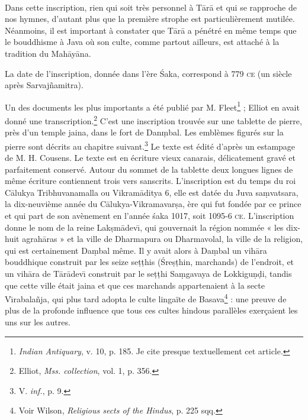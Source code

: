 \documentclass[a4paper, 11pt, oneside, french, landscape, twocolumn]{article}
\begin{document}
\paragraph{}
Dans cette inscription, rien qui soit très personnel à T\={a}r\={a} et qui se rapproche de nos hymnes, d'autant plus que la première strophe est particulièrement mutilée. Néanmoins, il est important à constater que T\={a}r\={a} a pénétré en même temps que le bouddhisme à Java où son culte, comme partout ailleurs, est attaché à la tradition du Mah\={a}y\={a}na.

La date de l'inscription, donnée dans l'ère \'{S}aka, correspond à 779 \textsc{ce} (un siècle après Sarvaj\~{n}amitra).

Un des documents les plus importants a été publié par M. Fleet\footnote{\emph{Indian Antiquary}, v. 10, p. 185. Je cite presque textuellement cet article.} ; Elliot en avait donné une transcription.\footnote{Elliot, \emph{Mss. collection}, vol. 1, p. 356.} C'est une inscription trouvée sur une tablette de pierre, près d'un temple jaina, dans le fort de Dan\d{m}bal. Les emblèmes figurés sur la pierre sont décrits au chapitre suivant.\footnote{V. \emph{inf.}, p. 9.} Le texte est édité d'après un estampage de M. H. Cousens. Le texte est en écriture vieux canarais, délicatement gravé et parfaitement conservé. Autour du sommet de la tablette deux longues lignes de même écriture contiennent trois vers sanscrits. L'inscription est du temps du roi C\={a}lukya Tribhuvanamalla ou Vikram\={a}ditya 6, elle est datée du Juva sa\d{m}vatsara, la dix-neuvième année du C\={a}lukya-Vikramavar\d{s}a, ère qui fut fondée par ce prince et qui part de son avènement en l'année \'{s}aka 1017, soit 1095-6 \textsc{ce}. L'inscription donne le nom de la reine Lak\d{s}m\={a}dev\={\i}, qui gouvernait la région nommée « les dix-huit agrah\={a}ras » et la ville de Dharmapura ou Dharmavolal, la ville de la religion, qui est certainement Da\d{m}bal même. Il y avait alors à Da\d{m}bal un vih\={a}ra bouddhique construit par les seize se\d{t}\d{t}his (\'{S}re\d{s}\d{t}hin, marchands) de l'endroit, et un vih\={a}ra de T\={a}r\={a}dev\={\i} construit par le se\d{t}\d{t}hi Sa\d{m}gavaya de Lokkigu\d{n}\d{d}i, tandis que cette ville était jaina et que ces marchands appartenaient à la secte V\={\i}rabala\~{n}ja, qui plus tard adopta le culte lingaïte de Basava\footnote{Voir Wilson, \emph{Religious sects of the Hindus}, p. 225 sqq.} : une preuve de plus de la profonde influence que tous ces cultes hindous parallèles exerçaient les uns sur les autres.
\end{document}
